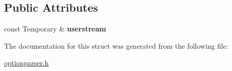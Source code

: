 \subsection*{Public Attributes}
\begin{DoxyCompactItemize}
\item 
const Temporary \& {\bfseries userstream}\hypertarget{structoption_1_1PrintUsageImplementation_1_1TemporaryWriter_a91d54cfcea7bb4072072506d46cc2cc8}{}\label{structoption_1_1PrintUsageImplementation_1_1TemporaryWriter_a91d54cfcea7bb4072072506d46cc2cc8}

\end{DoxyCompactItemize}


The documentation for this struct was generated from the following file\+:\begin{DoxyCompactItemize}
\item 
\hyperlink{optionparser_8h}{optionparser.\+h}\end{DoxyCompactItemize}
